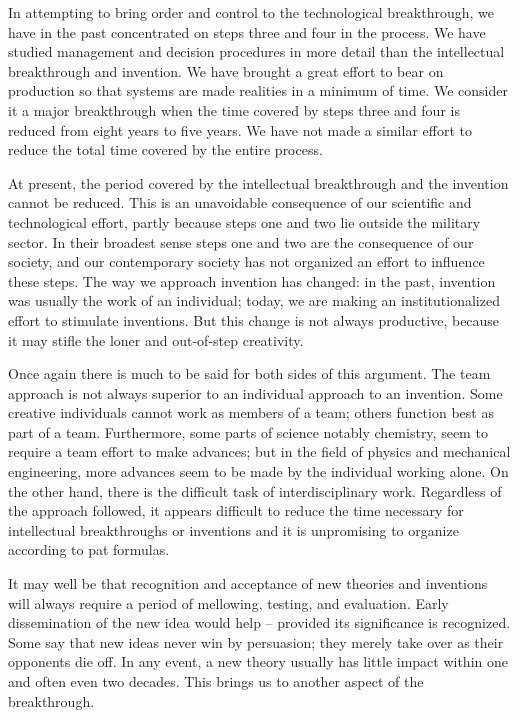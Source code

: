 In attempting to bring order and control to the technological breakthrough, we have in the past concentrated on steps three and four in the process. We have studied management and decision procedures in more detail than the intellectual breakthrough and invention. We have brought a great effort to bear on production so that systems are made realities in a minimum of time. We consider it a major breakthrough when the time covered by steps three and four is reduced from eight years to five years. We have not made a similar effort to reduce the total time covered by the entire process.

At present, the period covered by the intellectual breakthrough and the invention cannot be reduced. This is an unavoidable consequence of our scientific and technological effort, partly because steps one and two lie outside the military sector. In their broadest sense steps one and two are the consequence of our society, and our contemporary society has not organized an effort to influence these steps. The way we approach invention has changed: in the past, invention was usually the work of an individual; today, we are making an institutionalized effort to stimulate inventions. But this change is not always productive, because it may stifle the loner and out-of-step creativity.

Once again there is much to be said for both sides of this argument. The team approach is not always superior to an individual approach to an invention. Some creative individuals cannot work as members of a team; others function best as part of a team. Furthermore, some parts of science notably chemistry, seem to require a team effort to make advances; but in the field of physics and mechanical engineering, more advances seem to be made by the individual working alone. On the other hand, there is the difficult task of interdisciplinary work. Regardless of the approach followed, it appears difficult to reduce the time necessary for intellectual breakthroughs or inventions and it is unpromising to organize according to pat formulas.

It may well be that recognition and acceptance of new theories and inventions will always require a period of mellowing, testing, and evaluation. Early dissemination of the new idea would help -- provided its significance is recognized. Some say that new ideas never win by persuasion; they merely take over as their opponents die off. In any event, a new theory usually has little impact within one and often even two decades. This brings us to another aspect of the breakthrough.

